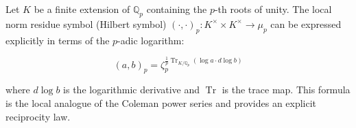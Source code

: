 Let $K$ be a finite extension of $\mathbb{Q}_p$ containing the $p$-th roots of unity. The local norm residue symbol (Hilbert symbol) $(\cdot, \cdot)_p: K^{\times} \times K^{\times} \to \mu_p$ can be expressed explicitly in terms of the $p$-adic logarithm:

$$(a, b)_p = \zeta_p^{\frac{1}{p} \operatorname{Tr}_{K/\mathbb{Q}_p}(\log a \cdot d\log b)}$$

where $d\log b$ is the logarithmic derivative and $\operatorname{Tr}$ is the trace map. This formula is the local analogue of the Coleman power series and provides an explicit reciprocity law.
